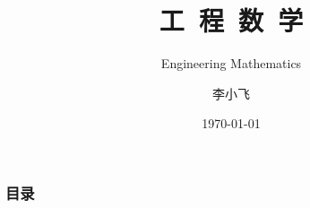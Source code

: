 \documentclass[12pt,UTF8,aspectratio=169]{beamer}
\begin{document}

\author{\myfont 李小飞}
\title{\textbf{\Huge 工~程~数~学}}
\subtitle{Engineering Mathematics}
\date{\today}

    \frame[plain]{\titlepage}
   \begin{frame}
        \frametitle{目录}
        \tableofcontents
    \end{frame}


%
%
%
  
\end{document}
